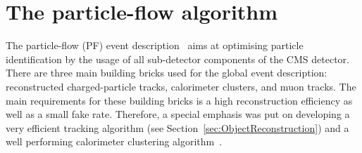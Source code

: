 \section{The particle-flow algorithm}
\label{sec:PFalgorithm}
The particle-flow (PF) event description~\cite{CMS-PAS-PFT-09-001} aims at optimising particle identification by the usage of all sub-detector components of the CMS detector.
There are three main building bricks used for the global event description: reconstructed charged-particle tracks, calorimeter clusters, and muon tracks.
The main requirements for these building bricks is a high reconstruction efficiency as well as a small fake rate.
Therefore, a special emphasis was put on developing a very efficient tracking algorithm (see Section~\ref{sec:ObjectReconstruction}) and a well performing calorimeter clustering algorithm~\cite{CMS-PAS-PFT-09-001}. 

